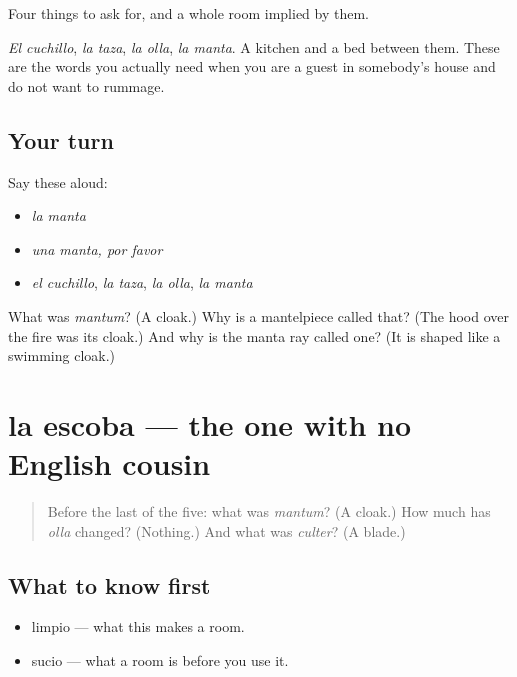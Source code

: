 \begin{grammarlens}[title={What you've built}]
Four things to ask for, and a whole room implied by them.

\emph{El cuchillo}, \emph{la taza}, \emph{la olla}, \emph{la manta}. A kitchen and a bed between them. These are the words you actually need when you are a guest in somebody's house and do not want to rummage.
\end{grammarlens}

\subsection*{Your turn}
Say these aloud:

\begin{itemize}
\raggedright
  \item \emph{la manta}
  \item \emph{una manta, por favor}
  \item \emph{el cuchillo}, \emph{la taza}, \emph{la olla}, \emph{la manta}
\end{itemize}

\begin{tcolorbox}[breakable,colback=teal!4,colframe=teal!35!black,title={Before you move on}]
What was \emph{mantum}? (A cloak.) Why is a mantelpiece called that? (The hood over the fire was its cloak.) And why is the manta ray called one? (It is shaped like a swimming cloak.)
\end{tcolorbox}
\section[la escoba]{la escoba — the one with no English cousin}

\label{lesson:ES-C294-escoba}



\begin{quote}
Before the last of the five: what was \emph{mantum}? (A cloak.) How much has \emph{olla} changed? (Nothing.) And what was \emph{culter}? (A blade.)
\end{quote}

\subsection*{What to know first}
\begin{itemize}
\raggedright
  \item limpio — what this makes a room.
  \item sucio — what a room is before you use it.
\end{itemize}

